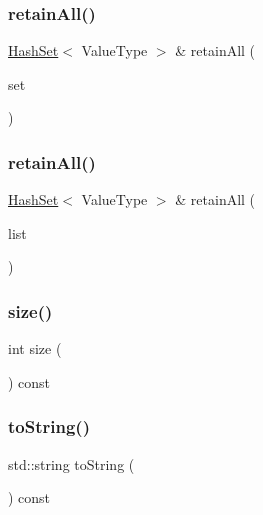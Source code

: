 \mbox{\label{classHashSet_a316099cf6e8079e4c1d41c60d89a48b4}} 
\subsubsection{\texorpdfstring{retain\+All()}{retainAll()}\hspace{0.1cm}{\footnotesize\ttfamily [1/2]}}
{\footnotesize\ttfamily \mbox{\hyperlink{classHashSet}{Hash\+Set}}$<$ Value\+Type $>$ \& retain\+All (\begin{DoxyParamCaption}\item[{const \mbox{\hyperlink{classHashSet}{Hash\+Set}}$<$ Value\+Type $>$ \&}]{set }\end{DoxyParamCaption})}

\mbox{\label{classHashSet_a0aefd5a11e45f8ddcec51d83a92fd5d8}} 
\subsubsection{\texorpdfstring{retain\+All()}{retainAll()}\hspace{0.1cm}{\footnotesize\ttfamily [2/2]}}
{\footnotesize\ttfamily \mbox{\hyperlink{classHashSet}{Hash\+Set}}$<$ Value\+Type $>$ \& retain\+All (\begin{DoxyParamCaption}\item[{std\+::initializer\+\_\+list$<$ Value\+Type $>$}]{list }\end{DoxyParamCaption})}

\mbox{\label{classHashSet_af9593d4a5ff4274efaf429cb4f9e57cc}} 
\subsubsection{\texorpdfstring{size()}{size()}}
{\footnotesize\ttfamily int size (\begin{DoxyParamCaption}{ }\end{DoxyParamCaption}) const}

\mbox{\label{classHashSet_a1fe5121d6528fdea3f243321b3fa3a49}} 
\subsubsection{\texorpdfstring{to\+String()}{toString()}}
{\footnotesize\ttfamily std\+::string to\+String (\begin{DoxyParamCaption}{ }\end{DoxyParamCaption}) const}

